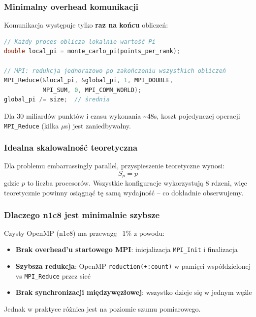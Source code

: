 \subsubsection{Minimalny overhead komunikacji}

Komunikacja występuje tylko \textbf{raz na końcu} obliczeń:

\begin{lstlisting}[language=C]
// Każdy proces oblicza lokalnie wartość Pi
double local_pi = monte_carlo_pi(points_per_rank);

// MPI: redukcja jednorazowo po zakończeniu wszystkich obliczeń
MPI_Reduce(&local_pi, &global_pi, 1, MPI_DOUBLE, 
           MPI_SUM, 0, MPI_COMM_WORLD);
global_pi /= size;  // średnia
\end{lstlisting}

Dla 30 miliardów punktów i czasu wykonania \textasciitilde48s, koszt pojedynczej operacji \texttt{MPI\_Reduce} (kilka $\mu$s) jest zaniedbywalny.

\subsubsection{Idealna skalowalność teoretyczna}

Dla problemu embarrassingly parallel, przyspieszenie teoretyczne wynosi:
\begin{equation}
    S_p = p
\end{equation}
gdzie $p$ to liczba procesorów. Wszystkie konfiguracje wykorzystują 8 rdzeni, więc teoretycznie powinny osiągnąć tę samą wydajność -- co dokładnie obserwujemy.

\subsubsection{Dlaczego n1c8 jest minimalnie szybsze}

Czysty OpenMP (n1c8) ma przewagę ~1\% z powodu:
\begin{itemize}
    \item \textbf{Brak overhead'u startowego MPI}: inicjalizacja \texttt{MPI\_Init} i finalizacja
    \item \textbf{Szybsza redukcja}: OpenMP \texttt{reduction(+:count)} w pamięci współdzielonej vs \texttt{MPI\_Reduce} przez sieć
    \item \textbf{Brak synchronizacji międzywęzłowej}: wszystko dzieje się w jednym węźle
\end{itemize}

Jednak w praktyce różnica jest na poziomie szumu pomiarowego.


